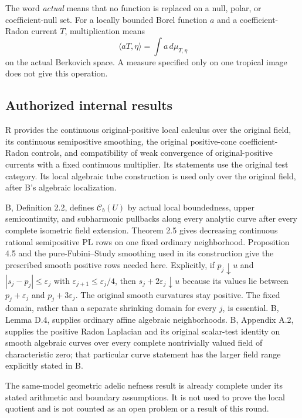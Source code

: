 \documentclass[11pt,a4paper]{article}
\numberwithin{equation}{section}
\theoremstyle{definition}
\theoremstyle{remark}
\begin{document}
The word \emph{actual} means that no function is replaced on a
null, polar, or coefficient-null set. For a locally bounded Borel
function $a$ and a coefficient-Radon current $T$, multiplication
means
\[
             \langle aT,\eta\rangle
                  =\int a\,d\mu_{T,\eta}
\]
on the actual Berkovich space. A measure specified only on one
tropical image does not give this operation.

\subsection{Authorized internal results}

\begin{description}[style=nextline]
\item[\texttt{INTERNAL\_INPUT}: R.]
R provides the continuous original-positive local calculus over
the original field, its continuous semipositive smoothing,
the original positive-cone coefficient-Radon controls, and
compatibility of weak convergence of original-positive currents
with a fixed continuous multiplier. Its statements use the original test
category. Its local algebraic tube construction is used only
over the original field, after B's algebraic localization.

\item[\texttt{INTERNAL\_INPUT}: B.]
B, Definition 2.2, defines $\mathcal C_b(U)$ by actual local
boundedness, upper semicontinuity, and subharmonic pullbacks
along every analytic curve after every complete isometric field
extension. Theorem 2.5 gives decreasing continuous rational
semipositive PL rows on one fixed ordinary neighborhood.
Proposition 4.5 and the pure-Fubini--Study smoothing used in
its construction give the prescribed smooth positive rows
needed here. Explicitly, if $p_j\downarrow u$ and
$|s_j-p_j|\leq\varepsilon_j$ with
$\varepsilon_{j+1}\leq\varepsilon_j/4$, then
$s_j+2\varepsilon_j\downarrow u$ because its values lie
between $p_j+\varepsilon_j$ and $p_j+3\varepsilon_j$.
The original smooth curvatures stay positive. The fixed domain,
rather than a separate shrinking domain for every $j$, is
essential. B, Lemma D.4, supplies ordinary affine algebraic
neighborhoods. B, Appendix A.2, supplies the positive Radon
Laplacian and its original scalar-test identity on smooth
algebraic curves over every complete nontrivially valued field
of characteristic zero; that particular curve statement has
the larger field range explicitly stated in B.

\item[\texttt{INTERNAL\_INPUT}: A2.]
The same-model geometric adelic nefness result is already
complete under its stated arithmetic and boundary assumptions.
It is not used to prove the local quotient and is not counted
as an open problem or a result of this round.
\end{description}
\end{document}
